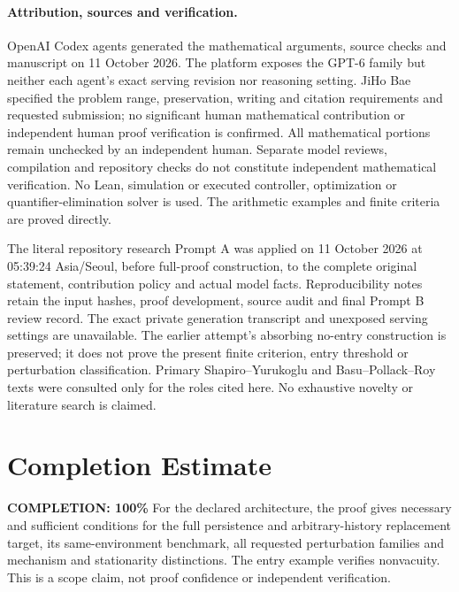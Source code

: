 \documentclass[11pt,a4paper]{article}
\begin{document}
\paragraph{Attribution, sources and verification.}
OpenAI Codex agents generated the mathematical arguments, source checks and
manuscript on 11 October 2026. The platform exposes the GPT-6 family but neither
each agent's exact serving revision nor reasoning setting. JiHo Bae specified
the problem range, preservation, writing and citation requirements and requested
submission; no significant human mathematical contribution or independent
human proof verification is confirmed. All mathematical portions remain
unchecked by an independent human. Separate model reviews, compilation and
repository checks do not constitute independent mathematical verification.
No Lean, simulation or executed controller, optimization or quantifier-elimination
solver is used. The arithmetic examples and finite criteria are proved directly.

The literal repository research Prompt A was applied on 11 October 2026 at
05:39:24 Asia/Seoul, before full-proof construction, to the complete original
statement, contribution policy and actual model facts. Reproducibility notes
retain the input hashes, proof development, source audit and final Prompt B
review record. The exact private generation transcript and unexposed serving
settings are unavailable. The earlier attempt's absorbing no-entry construction
is preserved; it does not prove the present finite criterion, entry threshold
or perturbation classification. Primary Shapiro--Yurukoglu and
Basu--Pollack--Roy texts were consulted only for the roles cited here.
No exhaustive novelty or literature search is claimed.

\section{Completion Estimate}
\noindent\textbf{COMPLETION: 100\%}
For the declared architecture, the proof gives necessary and sufficient conditions
for the full persistence and arbitrary-history replacement target, its
same-environment benchmark, all requested perturbation families and mechanism
and stationarity distinctions. The entry example verifies nonvacuity. This is
a scope claim, not proof confidence or independent verification.
\end{document}
